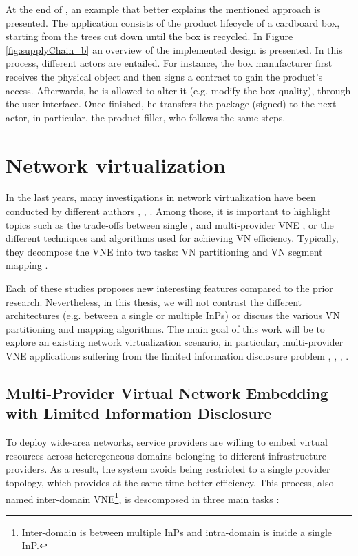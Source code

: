 At the end of \citep{abeyratne2016blockchain}, an example that better explains the mentioned approach is presented. The application consists of the product lifecycle of a cardboard box, starting from the trees cut down until the box is recycled. In Figure \ref{fig:supplyChain_b} an overview of the implemented design is presented. In this process, different actors are entailed. For instance, the box manufacturer first receives the physical object and then signs a contract to gain the product's access. Afterwards, he is allowed to alter it (e.g. modify the box quality), through the user interface. Once finished, he transfers the package (signed) to the next actor, in particular, the product filler, who follows the same steps.


\section{Network virtualization}

In the last years, many investigations in network virtualization have been conducted by different authors \citep{houidi2011virtual}, \citep{zhu2008cabernet}, \citep{chowdhury2009virtual}. Among those, it is important to highlight topics such as the trade-offs between single \citep{chowdhury2009virtual}, \citep{houidi2008distributed} and multi-provider VNE \citep{dietrich2017multi}, or the different techniques and algorithms used for achieving VN efficiency. Typically, they decompose the VNE into two tasks: VN partitioning and VN segment mapping \citep{fischer2013virtual}. 

Each of these studies proposes new interesting features compared to the prior research. Nevertheless, in this thesis, we will not contrast the different architectures (e.g. between a single or multiple InPs) or discuss the various VN partitioning and mapping algorithms. The main goal of this work will be to explore an existing network virtualization scenario, in particular, multi-provider VNE applications suffering from the limited information disclosure problem \citep{dietrich2017multi}, \citep{zaheer2010multi}, \citep{esposito2013general}, \citep{chowdhury2010polyvine}.

\subsection{Multi-Provider Virtual Network Embedding with Limited Information Disclosure}

To deploy wide-area networks, service providers are willing to embed virtual resources across heteregeneous domains belonging to different infrastructure providers. As a result, the system avoids being restricted to a single provider topology, which provides at the same time better efficiency. This process, also named inter-domain VNE\footnote{Inter-domain is between multiple InPs and intra-domain is inside a single InP.}, is descomposed in three main tasks \citep{chowdhury2010polyvine}:

